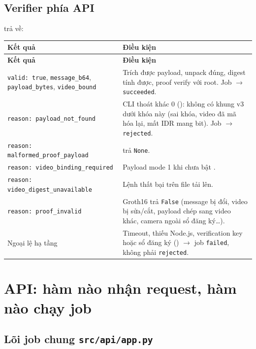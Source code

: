 \documentclass[11pt,a4paper]{article}
\begin{document}
\subsection{Verifier phía API}

 trả về:

\begin{longtable}{P{.36\textwidth}P{.55\textwidth}}
\toprule\textbf{Kết quả} & \textbf{Điều kiện} \\
\midrule\endfirsthead
\toprule\textbf{Kết quả} & \textbf{Điều kiện} \\
\midrule\endhead
\texttt{valid: true}, \texttt{message\_b64}, \texttt{payload\_bytes}, \texttt{video\_bound} & Trích được payload, unpack đúng, digest tính được, proof verify với root. Job $\to$ \texttt{succeeded}. \\
\texttt{reason: payload\_not\_found} & CLI thoát khác 0 (): không có khung v3 dưới khóa này (sai khóa, video đã mã hóa lại, mất IDR mang bit). Job $\to$ \texttt{rejected}. \\
\texttt{reason: malformed\_proof\_payload} &  trả \texttt{None}. \\
\texttt{reason: video\_binding\_required} & Payload mode 1 khi chưa bật . \\
\texttt{reason: video\_digest\_unavailable} & Lệnh  thất bại trên file tải lên. \\
\texttt{reason: proof\_invalid} & Groth16 trả \texttt{False} (message bị đổi, video bị sửa/cắt, payload chép sang video khác, camera ngoài sổ đăng ký\ldots). \\
Ngoại lệ hạ tầng & Timeout, thiếu Node.js, verification key hoặc sổ đăng ký () $\to$ job \texttt{failed}, không phải \texttt{rejected}. \\
\bottomrule\end{longtable}

\section{API: hàm nào nhận request, hàm nào chạy job}

\subsection{Lõi job chung \texorpdfstring{\texttt{src/api/app.py}}{src/api/app.py}}
\end{document}
